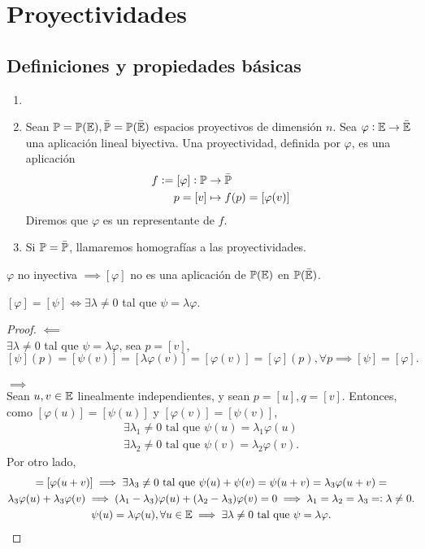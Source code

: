 \section{Proyectividades}
\subsection{Definiciones y propiedades básicas}

\begin{defi}
	\begin{enumerate}
		\item[]
		\item Sean $\mathbb{P} = \mathbb{P}(\mathbb{E}), \bar{\mathbb{P}} = \mathbb{P}(\bar{\mathbb{E}})$ espacios proyectivos de dimensión $n$. Sea $\varphi : \mathbb{E} \to \bar{\mathbb{E}}$ una aplicación lineal biyectiva. Una proyectividad, definida por $\varphi$, es una aplicación
		\begin{align*}
			f := [\varphi] : \mathbb{P} &\to \bar{\mathbb{P}} \\
			p = [v] &\mapsto f(p) = [\varphi(v)]
		\end{align*}
		Diremos que $\varphi$ es un representante de $f$.
		\item Si $\mathbb{P} = \bar{\mathbb{P}}$, llamaremos homografías a las proyectividades.
	\end{enumerate}
\end{defi}
\begin{obs}
	$\varphi$ no inyectiva $\implies [\varphi]$ no es una aplicación de $\mathbb{P}(\mathbb{E})$ en $\mathbb{P}(\bar{\mathbb{E}})$.
\end{obs}
\begin{obs}
	$[\varphi] = [\psi] \iff \exists \lambda \neq 0$ tal que $\psi = \lambda \varphi$.
\end{obs}
\begin{proof}
	$\impliedby$ \\
	$\exists \lambda \neq 0$ tal que $\psi = \lambda\varphi$, sea $p = [v]$, $[\psi](p) = [\psi(v)] = [\lambda\varphi(v)] = [\varphi(v)] = [\varphi](p), \forall p \implies [\psi] = [\varphi].$ \\ \\
	$\implies$ \\
	Sean $u, v \in \mathbb{E}$ linealmente independientes, y sean $p = [u], q = [v]$. Entonces, como $[\varphi(u)] = [\psi(u)]$ y $[\varphi(v)] = [\psi(v)]$,
	\begin{gather*}
		\exists \lambda_1 \neq 0 \text{ tal que } \psi(u) = \lambda_1 \varphi(u) \\
		\exists \lambda_2 \neq 0 \text{ tal que } \psi(v) = \lambda_2 \varphi(v).
	\end{gather*}
	Por otro lado,
	\begin{gather*}
		[\psi(u+v)] = [\varphi(u+v)] \implies \exists \lambda_3 \neq 0 \text{ tal que } \psi(u) + \psi(v) = \psi(u+v) = \lambda_3 \varphi(u+v) = \\ \lambda_3 \varphi(u) + \lambda_3 \varphi(v) \implies (\lambda_1 - \lambda_3) \varphi(u) + (\lambda_2-\lambda_3) \varphi(v) = 0 \implies \lambda_1 = \lambda_2 = \lambda_3 =: \lambda \neq 0. \\
		\psi(u) = \lambda \varphi(u), \forall u \in \E \implies \exists \lambda \neq 0 \text{ tal que } \psi = \lambda \varphi.
	\end{gather*}
\end{proof}
